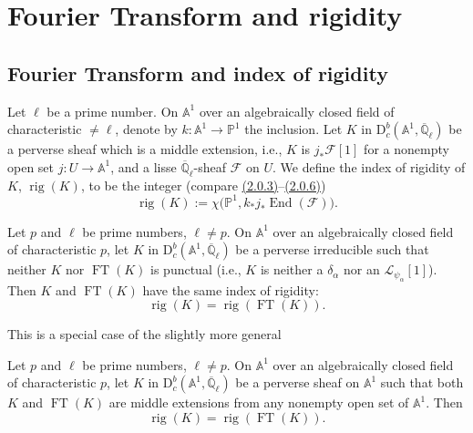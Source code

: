 \chapter{Fourier Transform and rigidity}
\label{chap:3}
\setcounter{section}{-1}

\newcommand{\chthreethmthreezerothree}{\hyperref[thm:3.0.3]{Theorem~3.0.3}}
\newcommand{\chthreethmthreezerofour}{\hyperref[thm:3.0.4]{Theorem~3.0.4}}

\section{Fourier Transform and index of rigidity}\label{sec:3.0}

Let \(\ell\) be a prime number. On \(\mathbb{A}^1\) over an algebraically
closed field of characteristic \(\ne \ell\), denote by
\(k:\mathbb{A}^1\to\mathbb{P}^1\) the inclusion. Let
\(K\) in \(\mathrm{D}^b_c(\mathbb{A}^1,\overline{\mathbb{Q}}_\ell)\) be a
perverse sheaf which is a middle extension, i.e., \(K\) is
\(j_*\mathcal{F}[1]\) for a nonempty open set
\(j:U\to\mathbb{A}^1\), and a lisse
\(\overline{\mathbb{Q}}_\ell\)-sheaf \(\mathcal{F}\) on \(U\). We define the
index of rigidity of \(K\), \(\operatorname{rig}(K)\), to be the integer
(compare \hyperref[par:2.0.3]{(2.0.3)}--\hyperref[par:2.0.6]{(2.0.6)})
\[
  \operatorname{rig}(K)
  := \chi\bigl(\mathbb{P}^1,k_*j_*\operatorname{End}(\mathcal{F})\bigr).
\]

Let \(p\) and \(\ell\) be prime numbers, \(\ell\ne p\). On
\(\mathbb{A}^1\) over an algebraically closed field of characteristic \(p\),
let \(K\) in
\(\mathrm{D}^b_c(\mathbb{A}^1,\overline{\mathbb{Q}}_\ell)\) be a perverse
irreducible such that neither \(K\) nor \(\operatorname{FT}(K)\) is punctual
(i.e., \(K\) is neither a \(\delta_\alpha\) nor an
\(\mathcal{L}_{\psi_\alpha}[1]\)). Then \(K\) and
\(\operatorname{FT}(K)\) have the same index of rigidity:
\[
  \operatorname{rig}(K)=\operatorname{rig}(\operatorname{FT}(K)).
\]

This is a special case of the slightly more general

Let \(p\) and \(\ell\) be prime numbers, \(\ell\ne p\). On
\(\mathbb{A}^1\) over an algebraically closed field of characteristic \(p\),
let \(K\) in
\(\mathrm{D}^b_c(\mathbb{A}^1,\overline{\mathbb{Q}}_\ell)\) be a perverse
sheaf on \(\mathbb{A}^1\) such that both \(K\) and
\(\operatorname{FT}(K)\) are middle extensions from any nonempty open set of
\(\mathbb{A}^1\). Then
\[
  \operatorname{rig}(K)=\operatorname{rig}(\operatorname{FT}(K)).
\]

